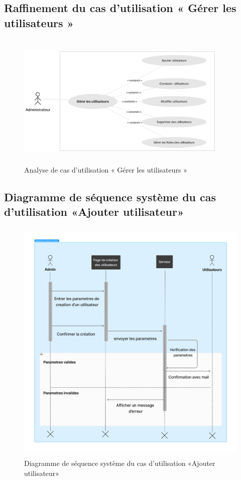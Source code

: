 \subsection{Raffinement du cas d'utilisation « Gérer les utilisateurs »}

\begin{figure}[ht!]
  \centering
  \includegraphics[width=0.9\textwidth,height=6.5cm]{chap3.images/gerer raf sprint 1.png}
  \caption{Analyse de cas d’utilisation « Gérer les utilisateurs »}

\end{figure}



\subsection{Diagramme de séquence système du cas d’utilisation «Ajouter utilisateur»}

\begin{figure}[ht!]
  \centering
  \includegraphics[width=1\textwidth,height=12cm]{chap3.images/3.png}
  \caption{ Diagramme de séquence système du cas d’utilisation «Ajouter utilisateur» }
\end{figure}

